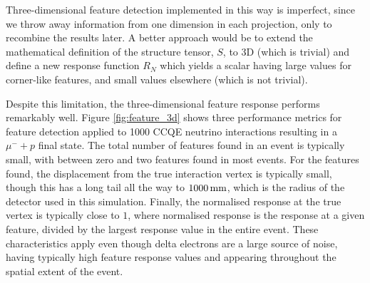 Three-dimensional feature detection implemented in this way is imperfect, since we throw away information from one dimension in each projection, only to recombine the results later. A better approach would be to extend the mathematical definition of the structure tensor, $S$, to 3D (which is trivial) and define a new response function $R_N$ which yields a scalar having large values for corner-like features, and small values elsewhere (which is not trivial).

Despite this limitation, the three-dimensional feature response performs remarkably well. Figure \ref{fig:feature_3d} shows three performance metrics for feature detection applied to 1000 \ac{CCQE} neutrino interactions resulting in a $\mu^{-} + p$ final state. The total number of features found in an event is typically small, with between zero and two features found in most events. For the features found, the displacement from the true interaction vertex is typically small, though this has a long tail all the way to $1000\,\mathrm{mm}$, which is the radius of the detector used in this simulation. Finally, the normalised response at the true vertex is typically close to $1$, where normalised response is the response at a given feature, divided by the largest response value in the entire event. These characteristics apply even though delta electrons are a large source of noise, having typically high feature response values and appearing throughout the spatial extent of the event.


